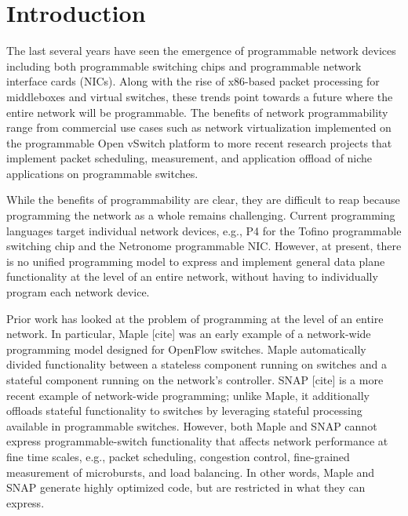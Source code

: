 \documentclass[12pt, oneside]{article}
\begin{document}
\newpage
\tableofcontents

\newpage
\listoffigures

\newpage
\lstlistoflistings

\newpage
\section{Introduction}
The last several years have seen the emergence of programmable network devices
including both programmable switching chips and programmable network interface
cards (NICs). Along with the rise of x86-based packet processing for
middleboxes and virtual switches, these trends point towards a future where the
entire network will be programmable. The benefits of network programmability
range from commercial use cases such as network virtualization implemented on
the programmable Open vSwitch platform to more recent research projects that
implement packet scheduling, measurement, and application offload of niche
applications on programmable switches.

While the benefits of programmability are clear, they are difficult to reap
because programming the network as a whole remains challenging. Current
programming languages target individual network devices, e.g., P4 for the
Tofino programmable switching chip and the Netronome programmable NIC. However,
at present, there is no unified programming model to express and implement
general data plane functionality at the level of an entire network, without
having to individually program each network device.

Prior work has looked at the problem of programming at the level of an entire
network. In particular, Maple [cite] was an early example of a
network-wide programming model designed for OpenFlow switches. Maple
automatically divided functionality between a stateless component running on
switches and a stateful component running on the network's controller.
SNAP [cite] is a more recent example of network-wide programming; unlike
Maple, it additionally offloads stateful functionality to switches by
leveraging stateful processing available in programmable switches.  However,
both Maple and SNAP cannot express programmable-switch functionality that
affects network performance at fine time scales, e.g., packet scheduling,
congestion control, fine-grained measurement of microbursts, and load
balancing. In other words, Maple and SNAP generate highly optimized code, but
are restricted in what they can express.
\end{document}
